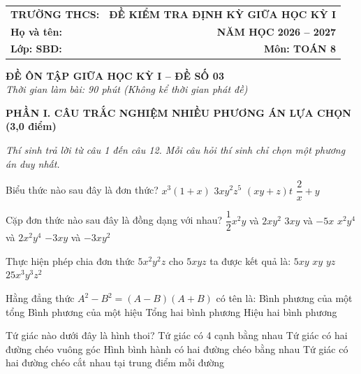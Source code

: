 \documentclass[12pt,a4paper]{article}
\begin{document}
\noindent
\begin{tabularx}{\linewidth}{X r}
\textbf{TRƯỜNG THCS: \dotfill} & \textbf{ĐỀ KIỂM TRA ĐỊNH KỲ GIỮA HỌC KỲ I} \\
\textbf{Họ và tên: \dotfill} & \textbf{NĂM HỌC 2026 -- 2027} \\
\textbf{Lớp: \dotfill \quad SBD: \dotfill} & \textbf{Môn: TOÁN 8} \\
\hline
\end{tabularx}
\vspace{2mm}

\begin{center}
  \textbf{\large ĐỀ ÔN TẬP GIỮA HỌC KỲ I -- ĐỀ SỐ 03}\\
  \textit{Thời gian làm bài: 90 phút (Không kể thời gian phát đề)}
\end{center}
\vspace{1mm}

\noindent\textbf{\large PHẦN I. CÂU TRẮC NGHIỆM NHIỀU PHƯƠNG ÁN LỰA CHỌN (3,0 điểm)}

\textit{Thí sinh trả lời từ câu 1 đến câu 12. Mỗi câu hỏi thí sinh chỉ chọn một phương án duy nhất.}

\vspace{1mm}
\begin{ex}
Biểu thức nào sau đây là đơn thức?
\choice
{$x^3(1 + x)$}
{\True $3xy^2z^5$}
{$(xy + z)t$}
{$\dfrac{2}{x} + y$}
\end{ex}

\begin{ex}
Cặp đơn thức nào sau đây là đồng dạng với nhau?
\choice
{$\dfrac{1}{2}x^2y$ và $2xy^2$}
{$3xy$ và $-5x$}
{\True $x^2y^4$ và $2x^2y^4$}
{$-3xy$ và $-3xy^2$}
\end{ex}

\begin{ex}
Thực hiện phép chia đơn thức $5x^2y^2z$ cho $5xyz$ ta được kết quả là:
\choice
{$5xy$}
{\True $xy$}
{$yz$}
{$25x^3y^3z^2$}
\end{ex}

\begin{ex}
Hằng đẳng thức $A^2 - B^2 = (A - B)(A + B)$ có tên là:
\choice
{Bình phương của một tổng}
{Bình phương của một hiệu}
{Tổng hai bình phương}
{\True Hiệu hai bình phương}
\end{ex}

\begin{ex}
Tứ giác nào dưới đây là hình thoi?
\choice
{\True Tứ giác có 4 cạnh bằng nhau}
{Tứ giác có hai đường chéo vuông góc}
{Hình bình hành có hai đường chéo bằng nhau}
{Tứ giác có hai đường chéo cắt nhau tại trung điểm mỗi đường}
\end{ex}
\end{document}
